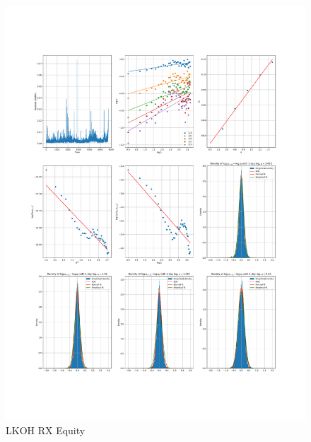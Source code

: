     \begin{figure}[h]
        \centering
        \includegraphics[width=\textwidth]{fig/LKOH RX Equity.pdf}
        \caption{LKOH RX Equity}
    \end{figure} 
        
